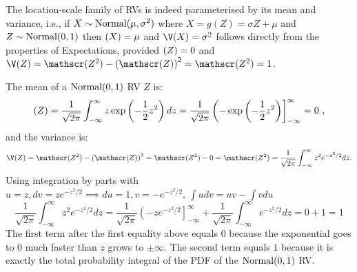 \begin{example}\label{EgMeanAndVarOfNormalMuSigmaSquareRV}
The location-scale family of RVs is indeed parameterised by its mean and variance, i.e., if  $X \sim \mbox{{\rm Normal}}(\mu,\sigma^2)$ where $X=g(Z)= \sigma Z+\mu$ and $Z \sim \mbox{{\rm Normal}}(0,1)$ then $\mathscr{(}X) = \mu$ and $\V(X) = \sigma^2$ follows directly from the properties of Expectations, provided $\mathscr{(}Z)=0$ and $\V(Z)=\E(Z^2)-\left(\E(Z)\right)^2=\E(Z^2)=1$.

The mean of a $\mbox{{\rm Normal}}(0,1)$ RV $Z$ is:
\[
\mathscr{(}Z) = \frac{1}{\sqrt{2 \pi}} \int_{-\infty}^{\infty} z \exp{\left( - \frac{1}{2} z^2 \right)}\,dz
 = \frac{1}{\sqrt{2 \pi}} \left(  -\exp{\left( - \frac{1}{2} z^2 \right)} \right]_{-\infty}^{\infty} 
= 0 \ ,
\]
and the variance is:
\[
\V(Z) =\E(Z^2)-\left(\E(Z)\right)^2=\E(Z^2)-0=\E(Z^2) = \frac{1}{\sqrt{2 \pi}} \int_{-\infty}^{\infty} z^2 e^{-z^2/2} dz .
\]
Using integration by parts with $u = z, dv=ze^{-z^2/2} \implies du=1, v=-e^{-z^2/2}, \, \int u dv = uv - \int v du$
\[
\frac{1}{\sqrt{2 \pi}} \int_{-\infty}^{\infty} z^2 e^{-z^2/2} dz =  \frac{1}{\sqrt{2 \pi}} \left( -z e^{-z^2/2} \right]_{-\infty}^{\infty} + \frac{1}{\sqrt{2 \pi}} \int_{-\infty}^{\infty} e^{-z^2/2} dz = 0 + 1 = 1
\]
The first term after the first equality above equals $0$ because the exponential goes to $0$ much faster than $z$ grows to $\pm \infty$. 
The second term equals $1$ because it is exactly the total probability integral of the PDF of the $\mbox{{\rm Normal}}(0,1)$ RV.
\end{example}

